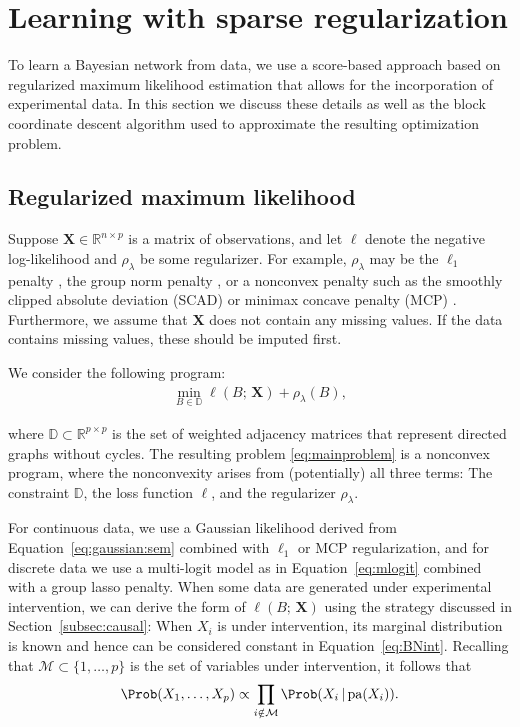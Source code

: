 \documentclass[article]{jss}
\newcommand{\nll}{\ell}
\newcommand{\R}{\mathbb{R}}
\newcommand{\dagmat}{B}
\newcommand{\dagest}{\widehat{\dagmat}}
\newcommand{\dagspace}{\mathbb{D}}
\newcommand{\reg}{\rho}
\newcommand{\pl}{\reg_{\lambda}}
\newcommand{\samplemat}{\mathbf{X}}
\renewcommand{\|}{\,|\,}
\begin{document}
\section{Learning with sparse regularization}
\label{sec:methods}

To learn a Bayesian network from data, we use a score-based approach based on regularized maximum likelihood estimation that allows for the incorporation of experimental data. In this section we discuss these details as well as the block coordinate descent algorithm used to approximate the resulting optimization problem.

\subsection{Regularized maximum likelihood}
\label{subsec:pmle}

Suppose $\samplemat\in\R^{n\times p}$ is a matrix of observations, and let $\nll$ denote the negative log-likelihood and $\pl$ be some regularizer. For example, $\pl$ may be the $\ell_{1}$ penalty \citep{tibshirani1996}, the group norm penalty \citep{yuan2006}, or a nonconvex penalty such as the smoothly clipped absolute deviation (SCAD) \citep{fan2001} or minimax concave penalty (MCP) \citep{zhang2010}. Furthermore, we assume that $\samplemat$ does not contain any missing values. If the data contains missing values, these should be imputed first.

We consider the following program:
\begin{align}
\label{eq:mainproblem}
\min_{\dagmat\in\dagspace} \nll(\dagmat;\,\samplemat) + \pl(\dagmat),
\end{align}

\noindent
where $\dagspace\subset\R^{p\times p}$ is the set of weighted adjacency matrices that represent directed graphs without cycles. The resulting problem \eqref{eq:mainproblem} is a nonconvex program, where the nonconvexity arises from (potentially) all three terms: The constraint $\dagspace$, the loss function $\nll$, and the regularizer $\pl$.

For continuous data, we use a Gaussian likelihood derived from Equation~\ref{eq:gaussian:sem} combined with $\ell_{1}$ or MCP regularization, and for discrete data we use a multi-logit model as in Equation~\ref{eq:mlogit} combined with a group lasso penalty. When some data are generated under experimental intervention, we can derive the form of $\nll(\dagmat;\,\samplemat)$ using the strategy discussed in Section~\ref{subsec:causal}: When $X_i$ is under intervention, its marginal distribution is known and hence can be considered constant in Equation~\ref{eq:BNint}. Recalling that $\mathcal{M} \subset\{1,\ldots,p\}$ is the set of variables under intervention, it follows that
\begin{align*}
\Prob(X_1,\ldots,X_p) \propto \prod_{i \notin \mathcal{M}}\Prob(X_i\|\text{pa}(X_i)).
\end{align*}
\end{document}
